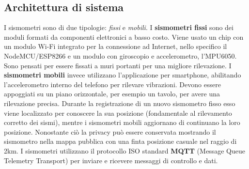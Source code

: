 \documentclass[a4paper,10pt]{memoir}
\begin{document}
\subsection{Architettura di sistema}
I sismometri sono di due tipologie: \textit{fissi} e \textit{mobili}.
I \textbf{sismometri fissi} sono dei moduli formati da componenti elettronici a basso costo. Viene usato un chip con un modulo Wi-Fi integrato per la connessione ad Internet, nello specifico il NodeMCU/ESP8266 e un modulo con giroscopio e accelerometro, l'MPU6050.
Sono pensati per essere fissati a muri portanti per una migliore rilevazione.
I \textbf{sismometri mobili} invece utilizzano l'applicazione per smartphone, abilitando l'accelerometro interno del telefono per rilevare vibrazioni.
Devono essere appoggiati su un piano orizzontale, per esempio un tavolo, per avere una rilevazione precisa.
Durante la registrazione di un nuovo sismometro fisso esso viene localizzato per conoscere la sua posizione (fondamentale al rilevamento corretto dei sismi), mentre i sismometri mobili aggiornano di continuano la loro posizione. Nonostante ciò la privacy può essere conservata mostrando il sismometro nella mappa pubblica con una finta posizione casuale nel raggio di 2km.
I sismometri utilizzano il protocollo ISO standard \textbf{MQTT} (Message Queue Telemetry Transport) per inviare e ricevere messaggi di controllo e dati.
\end{document}

